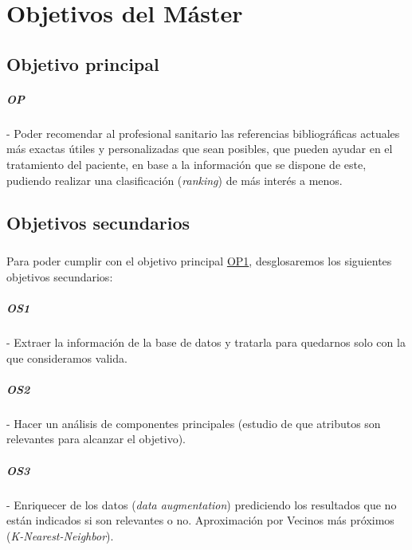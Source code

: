 \chapter{Objetivos del Máster}
\label{chapter:objetivos}


\section{Objetivo principal}

\label{op:OP1}
\paragraph{OP} - Poder recomendar al profesional sanitario las referencias bibliográficas actuales más exactas útiles y personalizadas que sean posibles, que pueden ayudar en el tratamiento del paciente, en base a la información que se dispone de este, pudiendo realizar una clasificación (\textit{ranking}) de más interés a menos.

\section{Objetivos secundarios}

\paragraph{}
Para poder cumplir con el objetivo principal \hyperref[op:OP1]{OP1}, desglosaremos los siguientes objetivos secundarios:

\label{os:OS1}
\paragraph{OS1} - Extraer la información de la base de datos y tratarla para quedarnos solo con la que consideramos valida.

\label{os:OS2}
\paragraph{OS2} - Hacer un análisis de componentes principales (estudio de que atributos son relevantes para alcanzar el objetivo).

\label{os:OS3}
\paragraph{OS3} - Enriquecer de los datos (\textit{data augmentation}) prediciendo los resultados que no están indicados si son relevantes o no. Aproximación por Vecinos más próximos (\textit{K-Nearest-Neighbor}).

